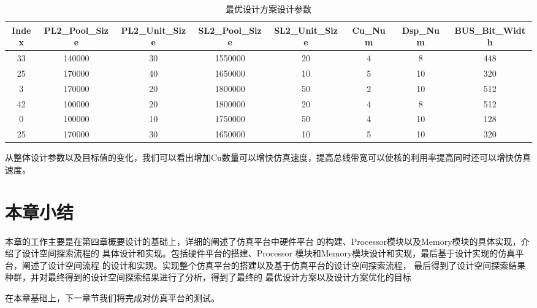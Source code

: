 \begin{table}[]
    \centering\footnotesize
    \caption{最优设计方案设计参数}
    \begin{tabular}{|c|c|c|c|c|c|c|c|}
    \hline
    Index & PL2\_Pool\_Size & PL2\_Unit\_Size & SL2\_Pool\_Size & SL2\_Unit\_Size & Cu\_Num & Dsp\_Num & BUS\_Bit\_Width \\ \hline
    33    & 140000          & 30              & 1550000         & 20              & 4       & 8        & 448             \\ \hline
    25    & 170000          & 40              & 1650000         & 10              & 5       & 10       & 320             \\ \hline
    3     & 170000          & 20              & 1800000         & 50              & 2       & 10       & 512             \\ \hline
    42    & 100000          & 20              & 1800000         & 20              & 4       & 8        & 512             \\ \hline
    0     & 100000          & 10              & 1750000         & 50              & 4       & 10       & 128             \\ \hline
    25    & 170000          & 30              & 1650000         & 10              & 5       & 10       & 320             \\ \hline
    \end{tabular}
    \end{table}

从整体设计参数以及目标值的变化，我们可以看出增加Cu数量可以增快仿真速度，提高总线带宽可以使核的利用率提高同时还可以增快仿真速度。

\section{本章小结}

本章的工作主要是在第四章概要设计的基础上，详细的阐述了仿真平台中硬件平台
的构建、Processor模块以及Memory模块的具体实现，介绍了设计空间探索流程的
具体设计和实现。包括硬件平台的搭建、Processor
模块和Memory模块设计和实现，最后基于设计实现的仿真平台，阐述了设计空间流程
的设计和实现。实现整个仿真平台的搭建以及基于仿真平台的设计空间探索流程，
最后得到了设计空间探索结果种群，并对最终得到的设计空间探索结果进行了分析，得到了最终的
最优设计方案以及设计方案优化的目标

在本章基础上，下一章节我们将完成对仿真平台的测试。